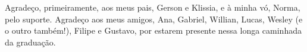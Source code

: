 

\begin{agradecimentos}
    Agradeço, primeiramente, aos meus pais, Gerson e Klissia, e à minha vó, Norma, pelo suporte. 
    Agradeço aos meus amigos, Ana, Gabriel, Willian, Lucas, Wesley (e o outro também!), Filipe e Gustavo, por estarem presente nessa longa caminhada da graduação.
    
\end{agradecimentos}
